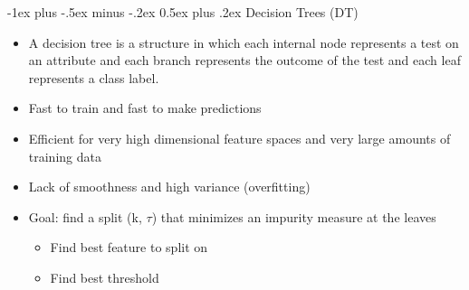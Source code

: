 \documentclass[10pt,a4paper,landscape]{article}
\makeatletter
\renewcommand{\section}{\@startsection{section}{1}{0mm}%
                                {-1ex plus -.5ex minus -.2ex}%
                                {0.5ex plus .2ex}%
                                {\normalfont\tiny\bfseries}}
\makeatother
\begin{document}
\begin{multicols*}{5}
\section{Decision Trees (DT)}
\begin{itemize}
    \item A decision tree is a structure in which each internal node represents a test on an attribute and each branch represents the outcome of the test and each leaf represents a class label.
    \item Fast to train and fast to make predictions
    \item Efficient for very high dimensional feature spaces and very large amounts of training data
    \item Lack of smoothness and high variance (overfitting)
    \item Goal: find a split (k, $\tau$) that minimizes an impurity measure at the leaves
    \begin{itemize}
        \item Find best feature to split on
        \item Find best threshold
    \end{itemize}
\end{itemize}


\end{multicols*}
\end{document}
